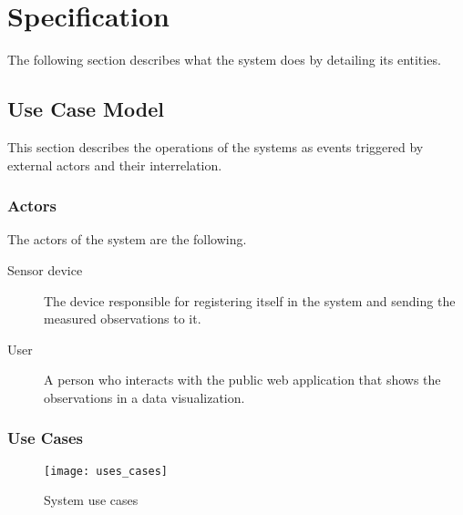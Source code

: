 \chapter{Specification}

The following section describes what the system does by detailing its entities.

\section{Use Case Model}

This section describes the operations of the systems as events triggered by external actors and their interrelation.

\subsection{Actors} \label{actors}

The actors of the system are the following.

\begin{description}
	\item[Sensor device] The device responsible for registering itself in the system and sending the measured observations to it.
	\item[User] A person who interacts with the public web application that shows the observations in a data visualization.
\end{description}

\subsection{Use Cases}

\begin{figure}[ht]
	\centering
	\texttt{[image: uses\_cases]}
	\caption{System use cases}
	\label{fig:use_cases}
\end{figure}

